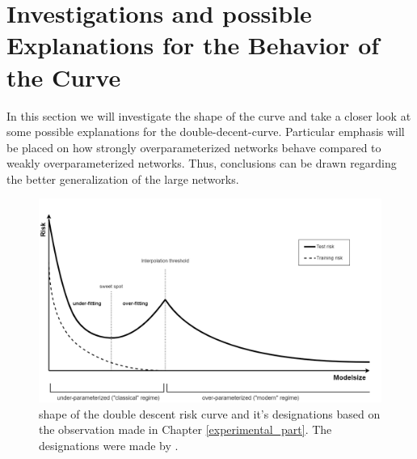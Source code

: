 \chapter{Investigations and possible Explanations for the Behavior of the Curve}

In this section we will investigate the shape of the curve and take a closer look at some possible explanations for the double-decent-curve. Particular emphasis will be placed on how strongly overparameterized networks behave compared to weakly overparameterized networks. Thus, conclusions can be drawn regarding the better generalization of the large networks.

\begin{figure}[!htp]
\centering
\includegraphics[scale=0.35]{Abschlussarbeit_2021/LaTeX/images/regimes_described.png}
\caption{shape of the double descent risk curve and it's designations based on the observation made in Chapter \ref{experimental_part}. The designations were made by \cite{belkin}. }
\label{double_descent_muster}
\end{figure}

